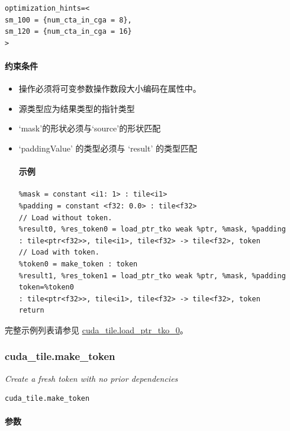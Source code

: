 \documentclass{article}
\begin{document}
\begin{lstlisting}
optimization_hints=<
sm_100 = {num_cta_in_cga = 8},
sm_120 = {num_cta_in_cga = 16}
>
\end{lstlisting}


\paragraph{约束条件}

\begin{itemize}
\item 操作必须将可变参数操作数段大小编码在属性中。
\item 源类型应为结果类型的指针类型
\item `mask'的形状必须与`source'的形状匹配
\item `paddingValue' 的类型必须与 `result' 的类型匹配


\paragraph{示例}

\begin{lstlisting}
%mask = constant <i1: 1> : tile<i1>
%padding = constant <f32: 0.0> : tile<f32>
// Load without token.
%result0, %res_token0 = load_ptr_tko weak %ptr, %mask, %padding
: tile<ptr<f32>>, tile<i1>, tile<f32> -> tile<f32>, token
// Load with token.
%token0 = make_token : token
%result1, %res_token1 = load_ptr_tko weak %ptr, %mask, %padding token=%token0
: tile<ptr<f32>>, tile<i1>, tile<f32> -> tile<f32>, token
return
\end{lstlisting}

\end{itemize}
完整示例列表请参见 \href{https://docs.nvidia.com/cuda/tile-ir/latest/sections/appendix.html#example-cuda-tile-load-ptr-tko-0}{cuda\_tile.load\_ptr\_tko\_0}。



\subsubsection{cuda\_tile.make\_token}

\textit{Create a fresh token with no prior dependencies}


\begin{lstlisting}
cuda_tile.make_token
\end{lstlisting}

\paragraph{参数}
\end{document}
